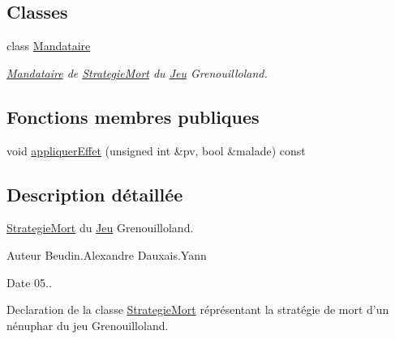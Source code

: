 \subsection*{Classes}
\begin{DoxyCompactItemize}
\item 
class \hyperlink{classgrenouilloland_1_1StrategieMort_1_1Mandataire}{Mandataire}
\begin{DoxyCompactList}\small\item\em \hyperlink{classgrenouilloland_1_1StrategieMort_1_1Mandataire}{Mandataire} de \hyperlink{classgrenouilloland_1_1StrategieMort}{Strategie\-Mort} du \hyperlink{classgrenouilloland_1_1Jeu}{Jeu} Grenouilloland. \end{DoxyCompactList}\end{DoxyCompactItemize}
\subsection*{Fonctions membres publiques}
\begin{DoxyCompactItemize}
\item 
void \hyperlink{classgrenouilloland_1_1StrategieMort_aef9dc1d5ce3195c955d9da69af806957}{appliquer\-Effet} (unsigned int \&pv, bool \&malade) const 
\end{DoxyCompactItemize}


\subsection{Description détaillée}
\hyperlink{classgrenouilloland_1_1StrategieMort}{Strategie\-Mort} du \hyperlink{classgrenouilloland_1_1Jeu}{Jeu} Grenouilloland. 

\begin{DoxyAuthor}{Auteur}
Beudin.\-Alexandre Dauxais.\-Yann 
\end{DoxyAuthor}
\begin{DoxyDate}{Date}
05..
\end{DoxyDate}
Declaration de la classe \hyperlink{classgrenouilloland_1_1StrategieMort}{Strategie\-Mort} réprésentant la stratégie de mort d'un nénuphar du jeu Grenouilloland. 

